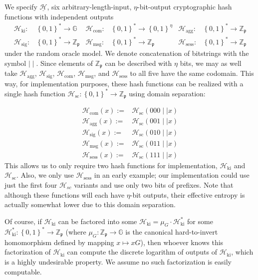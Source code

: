 \documentclass{mrl}
\theoremstyle{definition}
\numberwithin{theorem}{subsection}
\newcommand{\scalarField}{\mathbb{Z}_{\mathfrak{p}}}
\newcommand{\group}{\mathbb{G}}
\begin{document}
We specify $\underline{\mathcal{H}}$, six arbitrary-length-input, $\eta$-bit-output cryptographic hash functions with independent outputs
\begin{align*}
\mathcal{H}_{\text{ki}}:& \left\{0,1\right\}^* \to \group & \mathcal{H}_{\text{com}}:& \left\{0,1\right\}^* \to \left\{0,1\right\}^\eta & \mathcal{H}_{\text{agg}}:&  \left\{0,1\right\}^* \to \scalarField \\ \mathcal{H}_{\text{sig}}:& \left\{0,1\right\}^* \to \scalarField &
\mathcal{H}_{\text{msg}}:& \left\{0,1\right\}^* \to \scalarField &
\mathcal{H}_{\text{sess}}:& \left\{0,1\right\}^* \to \scalarField
\end{align*} under the random oracle model. We denote concatenation of bitstrings with the symbol $\mid \mid$. Since elements of $\scalarField$ can be described with $\eta$ bits, we may as well take $\mathcal{H}_{\text{agg}}$, $\mathcal{H}_{\text{sig}}$, $\mathcal{H}_{\text{com}}$, $\mathcal{H}_{\text{msg}}$, and $\mathcal{H}_{\text{sess}}$ to all five have the same codomain. This way, for implementation purposes, these hash functions can be realized with a single hash function $\mathcal{H}_{\text{sc}}:\left\{0,1\right\}^* \to \scalarField$ using domain separation:

\begin{align*}
\mathcal{H}_{\text{com}}(x) :=& \mathcal{H}_{\text{sc}}(000 \mid \mid x)\\
\mathcal{H}_{\text{agg}}(x) :=& \mathcal{H}_{\text{sc}}(001 \mid \mid x) \\ 
\mathcal{H}_{\text{sig}}(x) :=& \mathcal{H}_{\text{sc}}(010\mid \mid x) \\
\mathcal{H}_{\text{msg}}(x) :=& \mathcal{H}_{\text{sc}}(011\mid \mid x) \\
\mathcal{H}_{\text{sess}}(x) :=& \mathcal{H}_{\text{sc}}(111\mid \mid x)
\end{align*} This allows us to only require two hash functions for implementation, $\mathcal{H}_{\text{ki}}$ and $\mathcal{H}_{\text{sc}}$. Also, we only use $\mathcal{H}_{\text{sess}}$ in an early example; our implementation could use just the first four $\mathcal{H}_{sc}$ variants and use only two bits of prefixes. Note that although these functions will each have $\eta$-bit outputs, their effective entropy is actually somewhat lower due to this domain separation.%

Of course, if $\mathcal{H}_{\text{ki}}$ can be factored into some $\mathcal{H}_{\text{ki}} = \mu_G \cdot \mathcal{H}_{\text{ki}}^*$ for some $\mathcal{H}_{\text{ki}}^*:\left\{0,1\right\}^* \to \scalarField$ (where $\mu_G: \scalarField \to \group$ is the canonical hard-to-invert homomorphism defined by mapping $x \mapsto xG$), then whoever knows this factorization  of $\mathcal{H}_{\text{ki}}$ can compute the discrete logarithm of outputs of $\mathcal{H}_{\text{ki}}$, which is a highly undesirable property. We assume no such factorization is easily computable.
\end{document}
